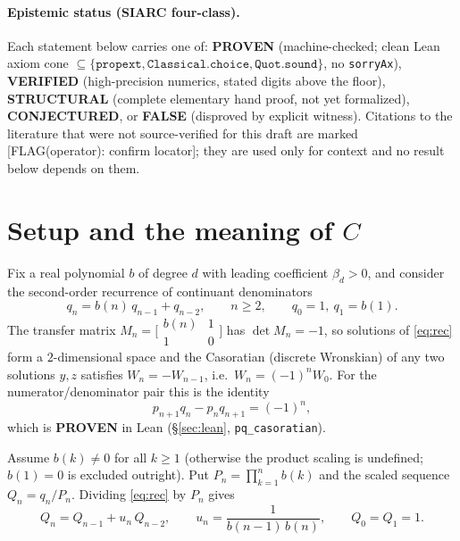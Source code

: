 \documentclass[11pt]{article}
\newcommand{\flag}[1]{{\color{red}\textsf{[FLAG(operator): #1]}}}
\begin{document}
\paragraph{Epistemic status (SIARC four-class).}
Each statement below carries one of:
\textbf{PROVEN} (machine-checked; clean Lean axiom cone
$\subseteq\{\texttt{propext},\texttt{Classical.choice},\texttt{Quot.sound}\}$,
no \texttt{sorryAx}),
\textbf{VERIFIED} (high-precision numerics, stated digits above the floor),
\textbf{STRUCTURAL} (complete elementary hand proof, not yet formalized),
\textbf{CONJECTURED}, or \textbf{FALSE} (disproved by explicit witness).
Citations to the literature that were not source-verified for this draft are
marked \flag{confirm locator}; they are used only for context and no result below
depends on them.

\section{Setup and the meaning of $C$}\label{sec:setup}

Fix a real polynomial $b$ of degree $d$ with leading coefficient $\beta_d>0$, and
consider the second-order recurrence of continuant denominators
\begin{equation}\label{eq:rec}
  q_n=b(n)\,q_{n-1}+q_{n-2},\qquad n\ge2,\qquad q_0=1,\ q_1=b(1).
\end{equation}
The transfer matrix $M_n=\bigl[\begin{smallmatrix}b(n)&1\\1&0\end{smallmatrix}\bigr]$
has $\det M_n=-1$, so solutions of \eqref{eq:rec} form a $2$-dimensional space and
the Casoratian (discrete Wronskian) of any two solutions $y,z$ satisfies
$W_n=-W_{n-1}$, i.e.\ $W_n=(-1)^nW_0$. For the numerator/denominator pair this is
the identity
\begin{equation}\label{eq:caso}
  p_{n+1}q_n-p_nq_{n+1}=(-1)^n,
\end{equation}
which is \textbf{PROVEN} in Lean (\S\ref{sec:lean}, \texttt{pq\_casoratian}).

Assume $b(k)\neq0$ for all $k\ge1$ (otherwise the product scaling is undefined;
$b(1)=0$ is excluded outright). Put $P_n=\prod_{k=1}^n b(k)$ and the scaled
sequence $Q_n=q_n/P_n$. Dividing \eqref{eq:rec} by $P_n$ gives
\begin{equation}\label{eq:scaled}
  Q_n=Q_{n-1}+u_n\,Q_{n-2},\qquad u_n=\frac{1}{b(n-1)\,b(n)},\qquad Q_0=Q_1=1.
\end{equation}
\end{document}
